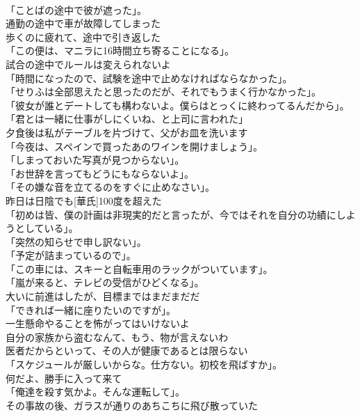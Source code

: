\documentclass[8pt]{extreport}
\begin{document}
\begin{CJK}{UTF8}{min}
\\	「ことばの途中で彼が遮った」。	
\\	通勤の途中で車が故障してしまった	
\\	歩くのに疲れて、途中で引き返した	
\\	「この便は、マニラに16時間立ち寄ることになる」。	
\\	試合の途中でルールは変えられないよ	
\\	「時間になったので、試験を途中で止めなければならなかった」。	
\\	「せりふは全部思えたと思ったのだが、それでもうまく行かなかった」。	
\\	「彼女が誰とデートしても構わないよ。僕らはとっくに終わってるんだから」。	
\\	「君とは一緒に仕事がしにくいね、と上司に言われた」	
\\	夕食後は私がテーブルを片づけて、父がお皿を洗います	
\\	「今夜は、スペインで買ったあのワインを開けましょう」。	
\\	「しまっておいた写真が見つからない」。	
\\	「お世辞を言ってもどうにもならないよ」。	
\\	「その嫌な音を立てるのをすぐに止めなさい」。	
\\	昨日は日陰でも[華氏]100度を超えた	
\\	「初めは皆、僕の計画は非現実的だと言ったが、今ではそれを自分の功績にしようとしている」。	
\\	「突然の知らせで申し訳ない」。	
\\	「予定が詰まっているので」。	
\\	「この車には、スキーと自転車用のラックがついています」。	
\\	「嵐が来ると、テレビの受信がひどくなる」。	
\\	大いに前進はしたが、目標まではまだまだだ	
\\	「できれば一緒に座りたいのですが」。	
\\	一生懸命やることを怖がってはいけないよ	
\\	自分の家族から盗むなんて、もう、物が言えないわ	
\\	医者だからといって、その人が健康であるとは限らない	
\\	「スケジュールが厳しいからな。仕方ない。初校を飛ばすか」。	
\\	何だよ、勝手に入って来て	
\\	「俺達を殺す気かよ。そんな運転して」。	
\\	その事故の後、ガラスが通りのあちこちに飛び散っていた	

\end{CJK}
\end{document}

